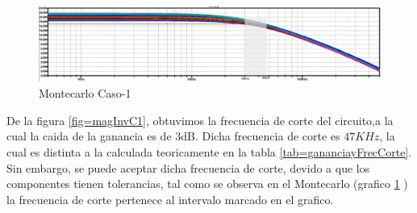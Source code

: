 \documentclass[../../main.tex]{subfiles}
\begin{document}
\begin{figure}[H]
\centering
\includegraphics[width=1\textwidth]{montecarlo_inv_c1}
\caption{Montecarlo Caso-1} \label{fig=mcInvC1}
\end{figure}


De la figura \ref{fig=magInvC1}, obtuvimos la frecuencia de corte del circuito,a la cual la caida de la ganancia es de 3dB. Dicha frecuencia de corte es $47KHz$, la cual es distinta a la calculada teoricamente en la tabla \ref{tab=gananciayFrecCorte}. Sin embargo, se puede aceptar dicha frecuencia de corte, devido a que los componentes tienen tolerancias, tal como se observa en el Montecarlo (grafico  \ref{fig=mcInvC1} ) la frecuencia de corte pertenece al intervalo marcado en el grafico.
\end{document}

